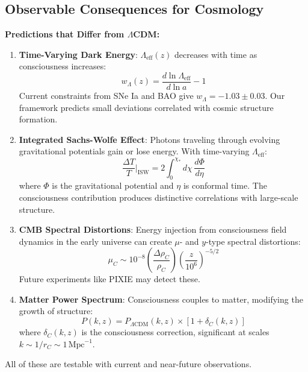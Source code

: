 \subsection{Observable Consequences for Cosmology}

\begin{level2}
\textbf{Predictions that Differ from $\Lambda$CDM:}

\begin{enumerate}
\item \textbf{Time-Varying Dark Energy}: $\Lambda_{\text{eff}}(z)$ decreases with time as consciousness increases:
\begin{equation}
w_{\Lambda}(z) = \frac{d\ln\Lambda_{\text{eff}}}{d\ln a} - 1
\end{equation}
Current constraints from SNe Ia and BAO give $w_{\Lambda} = -1.03 \pm 0.03$. Our framework predicts small deviations correlated with cosmic structure formation.

\item \textbf{Integrated Sachs-Wolfe Effect}: Photons traveling through evolving gravitational potentials gain or lose energy. With time-varying $\Lambda_{\text{eff}}$:
\begin{equation}
\frac{\Delta T}{T}\Big|_{\text{ISW}} = 2\int_0^{\chi_*} d\chi \, \frac{d\Phi}{d\eta}
\end{equation}
where $\Phi$ is the gravitational potential and $\eta$ is conformal time. The consciousness contribution produces distinctive correlations with large-scale structure.

\item \textbf{CMB Spectral Distortions}: Energy injection from consciousness field dynamics in the early universe can create $\mu$- and $y$-type spectral distortions:
\begin{equation}
\mu_C \sim 10^{-8} \left( \frac{\Delta \rho_C}{\rho_C} \right) \left( \frac{z}{10^6} \right)^{-5/2}
\end{equation}
Future experiments like PIXIE may detect these.

\item \textbf{Matter Power Spectrum}: Consciousness couples to matter, modifying the growth of structure:
\begin{equation}
P(k, z) = P_{\Lambda\text{CDM}}(k,z) \times \left[ 1 + \delta_{C}(k,z) \right]
\end{equation}
where $\delta_C(k,z)$ is the consciousness correction, significant at scales $k \sim 1/r_C \sim 1 \, \text{Mpc}^{-1}$.
\end{enumerate}

All of these are testable with current and near-future observations.
\end{level2}

